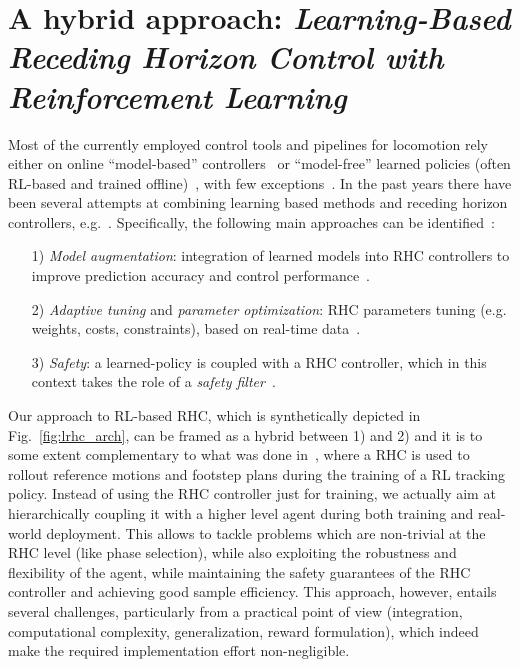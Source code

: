 \section{A hybrid approach: \textnormal{\textit{Learning-Based Receding Horizon Control with Reinforcement Learning}}}
Most of the currently employed control tools and pipelines for locomotion rely either on online ``model-based'' controllers~\cite{modern_mpc:grandia2023perceptive,web::atlas_grip_boston_dyn} or ``model-free'' learned policies (often RL-based and trained offline)~\cite{mpc_learn:aswani2012provably, mpc_learn:terzi2018learning, mpc_learn:soloperto2018learning, rl:schneider2023learning, rl:miki2024learning,mpc_learn:berkenkamp2016safe,mpc_learn:marco2016automatic,mpc_learn:brunner2015stabilizing,mpc_learn:rosolia2019learning,mpc_learn:englert2017inverse,mpc_learn:koller2018learning,mpc_learn:wabersich2021probabilistic,mpc_learn:gillulay2011guaranteed,mpc_learn:wabersich2018safe,mpc_learn:berkenkamp2017safe}, with few exceptions~\cite{hybrid_rl_to:Jenelten_2024}.
In the past years there have been several attempts at combining learning based methods and receding horizon controllers, e.g.~\cite{mpc_learn:tsounis2020deepgait,mpc_learn:gangapurwala2021real}. Specifically, the following main approaches can be identified~\cite{mpc_learn:hewing2020learning}:
\begin{itemize}
	\item[1)] \textit{Model augmentation}: integration of learned models into RHC controllers to improve prediction accuracy and control performance~\cite{mpc_learn:aswani2012provably,mpc_learn:terzi2018learning,mpc_learn:soloperto2018learning}.
	\item[2)] \textit{Adaptive tuning} and \textit{parameter optimization}: RHC parameters tuning (e.g. weights, costs, constraints), based on real-time data~\cite{mpc_learn:berkenkamp2016safe,mpc_learn:marco2016automatic,mpc_learn:brunner2015stabilizing,mpc_learn:rosolia2019learning,mpc_learn:englert2017inverse}.
	\item[3)] \textit{Safety}: a learned-policy is coupled with a RHC controller, which in this context takes the role of a \textit{safety filter}~\cite{mpc_learn:koller2018learning,mpc_learn:wabersich2021probabilistic,mpc_learn:gillulay2011guaranteed,mpc_learn:wabersich2018safe,mpc_learn:berkenkamp2017safe}.
\end{itemize}
Our approach to RL-based RHC, which is synthetically depicted in Fig.~\ref{fig:lrhc_arch}, can be framed as a hybrid between 1) and 2) and it is to some extent complementary to what was done in~\cite{mpc_learn:hewing2020learning}, where a RHC is used to rollout reference motions and footstep plans during the training of a RL tracking policy. Instead of using the RHC controller just for training, we actually aim at hierarchically coupling it with a higher level agent during both training and real-world deployment. This allows to tackle problems which are non-trivial at the RHC level (like phase selection), while also exploiting the robustness and flexibility of the agent, while maintaining the safety guarantees of the RHC controller and achieving good sample efficiency. 
This approach, however, entails several challenges, particularly from a practical point of view (integration, computational complexity, generalization, reward formulation), which indeed make the required implementation effort non-negligible. 